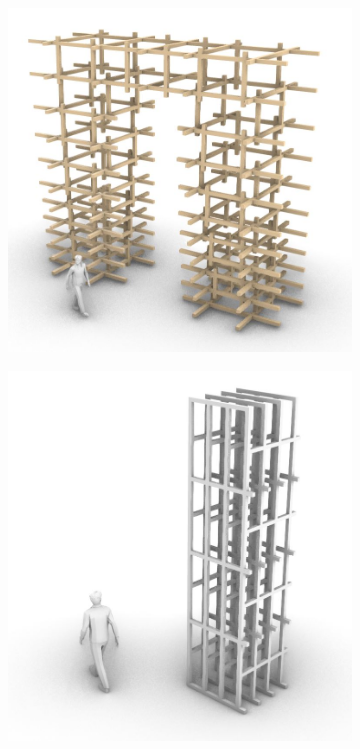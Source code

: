 \begin{figure}[p]
    \centering
    \begin{subfigure}[b]{0.49\textwidth}
        \centering
        \includegraphics[width=\textwidth]{images/04-4+5/ortho-design-study2.jpg}
    \end{subfigure}
    \hfill
    \begin{subfigure}[b]{0.49\textwidth}
        \centering
        \includegraphics[width=\textwidth]{images/04-4+5/ortho-design-study1.jpg}

\end{subfigure}
\end{figure}
